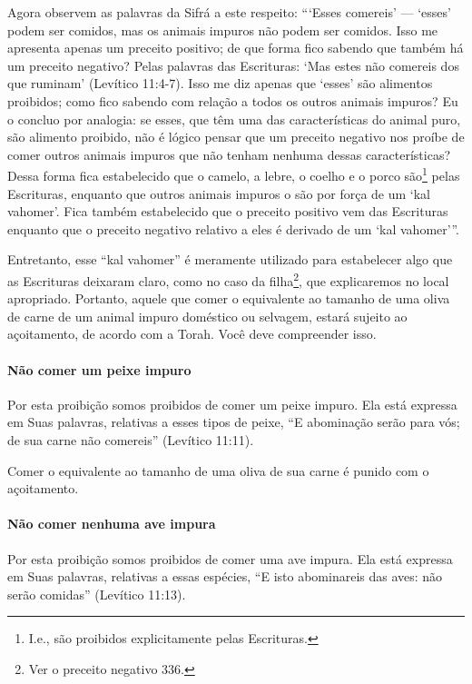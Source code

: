 Agora observem as palavras da Sifrá a este respeito: ```Esses comereis'
--- `esses' podem ser comidos, mas os animais impuros não podem ser
comidos. Isso me apresenta apenas um preceito positivo; de que forma
fico sabendo que também há um preceito negativo? Pelas palavras das
Escrituras: `Mas estes não comereis dos que ruminam' (Levítico 11:4-7).
Isso me diz apenas que `esses' são alimentos proibidos; como fico
sabendo com relação a todos os outros animais impuros? Eu o concluo por
analogia: se esses, que têm uma das características do animal puro, são
alimento proibido, não é lógico pensar que um preceito negativo nos
proíbe de comer outros animais impuros que não tenham nenhuma dessas
características? Dessa forma fica estabelecido que o camelo, a lebre, o
coelho e o porco são\footnote{I.e., são proibidos explicitamente pelas Escrituras.} pelas Escrituras, enquanto
que outros animais impuros o são por força de um `kal vahomer'. Fica
também estabelecido que o preceito positivo vem das Escrituras enquanto
que o preceito negativo relativo a eles é derivado de um `kal
vahomer'''.

Entretanto, esse ``kal vahomer'' é meramente utilizado para estabelecer
algo que as Escrituras deixaram claro, como no caso da
filha\footnote{Ver o preceito negativo 336.}, que explicaremos no local apropriado.
Portanto, aquele que comer o equivalente ao tamanho de uma oliva de
carne de um animal impuro doméstico ou selvagem, estará sujeito ao
açoitamento, de acordo com a Torah. Você deve compreender isso.


\paragraph{Não comer um peixe impuro}

Por esta proibição somos proibidos de comer um peixe impuro. Ela está
expressa em Suas palavras, relativas a esses tipos de peixe, ``E
abominação serão para vós; de sua carne não comereis'' (Levítico 11:11).

Comer o equivalente ao tamanho de uma oliva de sua carne é punido com o
açoitamento.

\paragraph{Não comer nenhuma ave impura}

Por esta proibição somos proibidos de comer uma ave impura. Ela está
expressa em Suas palavras, relativas a essas espécies, ``E isto
abominareis das aves: não serão comidas'' (Levítico 11:13).


